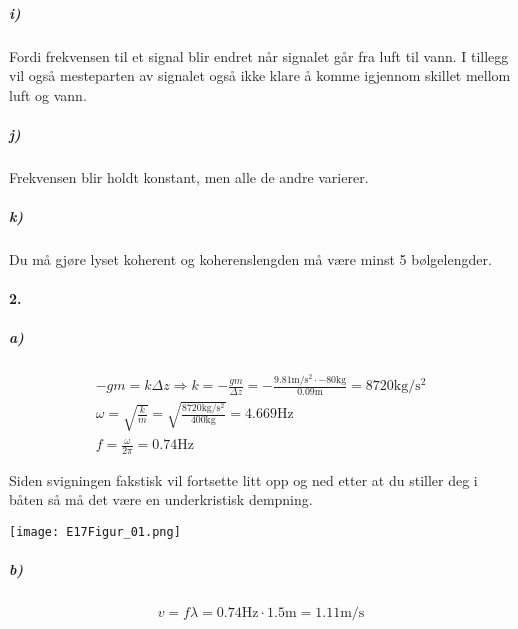 \documentclass[11pt, A4paper,norsk]{article}
\begin{document}
			\subparagraph{i)}
				\begin{flushleft}
Fordi frekvensen til et signal blir endret når signalet går fra luft til vann. I tillegg vil også mesteparten av signalet også ikke klare å komme igjennom skillet mellom luft og vann.
				\end{flushleft}










			\subparagraph{j)}
				\begin{flushleft}
Frekvensen blir holdt konstant, men alle de andre varierer.
				\end{flushleft}








			\subparagraph{k)}
				\begin{flushleft}
Du må gjøre lyset koherent og koherenslengden må være minst 5 bølgelengder.
				\end{flushleft}








		\paragraph{2.}
			\subparagraph{a)}
				\begin{gather*}
- g m = k \Delta z \Rightarrow k = - \frac{gm}{\Delta z} = - \frac{9.81 \text{m$/$s$^2$} \cdot - 80 \text{kg}}{0.09 \text{m}} = 8720 \text{kg$/$s$^2$} \\
\omega = \sqrt{\frac{k}{m}} = \sqrt{\frac{8720 \text{kg$/$s$^2$}}{400 \text{kg}}} = 4.669 \text{Hz} \\
f = \frac{\omega}{2 \pi} = 0.74 \text{Hz}
				\end{gather*}
				\begin{flushleft}
Siden svigningen fakstisk vil fortsette litt opp og ned etter at du stiller deg i båten så må det være en underkristisk dempning.
				\end{flushleft}
\texttt{[image: E17Figur\_01.png]}










			\subparagraph{b)}
				\begin{gather*}
v = f \lambda = 0.74 \text{Hz} \cdot 1.5 \text{m} = 1.11 \text{m$/$s}
				\end{gather*}
\end{document}
